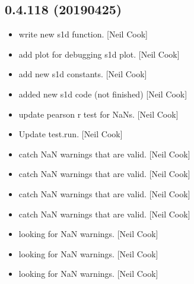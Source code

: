 \documentclass[a4paper,10pt,english]{report}
\begin{document}
\subsection{0.4.118 (2019\sphinxhyphen{}04\sphinxhyphen{}25)}
\label{\detokenize{misc/changelog:id161}}\begin{itemize}
\item {} 
 \sphinxhyphen{} write new s1d function. {[}Neil Cook{]}

\item {} 
 \sphinxhyphen{} add  plot for debugging s1d
plot. {[}Neil Cook{]}

\item {} 
 \sphinxhyphen{} add new s1d constants. {[}Neil Cook{]}

\item {} 
 \sphinxhyphen{} added new s1d code (not finished) {[}Neil
Cook{]}

\item {} 
 \sphinxhyphen{} update pearson r test for NaNs. {[}Neil Cook{]}

\item {} 
Update test.run. {[}Neil Cook{]}

\item {} 
 \sphinxhyphen{} catch NaN warnings that are valid. {[}Neil Cook{]}

\item {} 
 \sphinxhyphen{} catch NaN warnings that are valid. {[}Neil Cook{]}

\item {} 
 \sphinxhyphen{} catch NaN warnings that are valid. {[}Neil Cook{]}

\item {} 
 \sphinxhyphen{} catch NaN warnings that are valid. {[}Neil Cook{]}

\item {} 
 \sphinxhyphen{} looking for NaN warnings. {[}Neil Cook{]}

\item {} 
 \sphinxhyphen{} looking for NaN warnings. {[}Neil Cook{]}

\item {} 
 \sphinxhyphen{} looking for NaN warnings. {[}Neil Cook{]}


\end{itemize}
\end{document}
